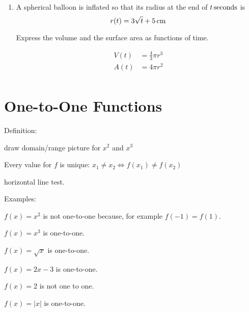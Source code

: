\documentclass{exam}
\begin{document}
\begin{enumerate}
\begin{solution}
    \end{solution}
    
  \item A spherical balloon is inflated so that its radius at the end of $\unit[t]{seconds}$ is 
    \[
      r(t) = \unit[3 \sqrt{t} + 5]{cm}
    \]

    Express the volume and the surface area as functions of time.

    \begin{solution}
      \begin{align*}
        V(t) &= \frac{4}{3} \pi r^3 \\
        A(t) &= 4 \pi r^2 \\
      \end{align*}
    \end{solution}

\end{enumerate}

\section{One-to-One Functions}

Definition:
\begin{itemize*}
  \item draw domain/range picture for $x^2$ and $x^3$
  \item Every value for $f$ is unique: $x_1 \neq x_2 \Leftrightarrow f(x_1) \neq f(x_2)$
  \item horizontal line test.
\end{itemize*}

Examples:
\begin{itemize*}
  \item $f(x) = x^2$ is not one-to-one because, for example $f(-1) = f(1)$.
  \item $f(x) = x^3$ is one-to-one.
  \item $f(x) = \sqrt{x}$ is one-to-one.
  \item $f(x) = 2x - 3$ is one-to-one.
  \item $f(x) = 2$ is not one to one.
  \item $f(x) = |x|$ is one-to-one.
\end{itemize*}
\end{document}
